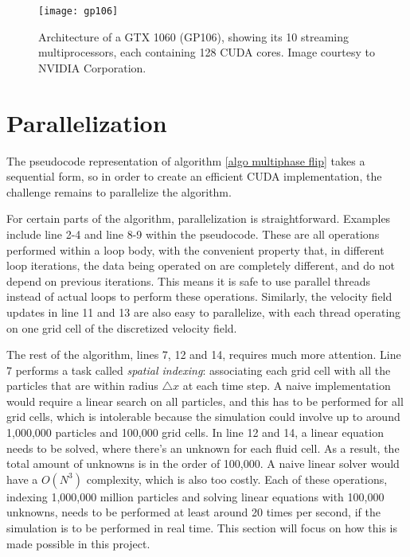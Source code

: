 \begin{figure}[H]
    \centering
    \texttt{[image: gp106]}
    \caption{Architecture of a GTX 1060 (GP106), showing its 10 streaming multiprocessors, each containing 128 CUDA cores. Image courtesy to NVIDIA Corporation.}
    \label{figure GTX1060}
\end{figure}



\section{Parallelization}
The pseudocode representation of algorithm \ref{algo multiphase flip} takes a sequential form, so in order to create an efficient CUDA implementation, the challenge remains to parallelize the algorithm.

For certain parts of the algorithm, parallelization is straightforward. Examples include line 2-4 and line 8-9 within the pseudocode. These are all operations performed within a loop body, with the convenient property that, in different loop iterations, the data being operated on are completely different, and do not depend on previous iterations. This means it is safe to use parallel threads instead of actual loops to perform these operations. Similarly, the velocity field updates in line 11 and 13 are also easy to parallelize, with each thread operating on one grid cell of the discretized velocity field. 

The rest of the algorithm, lines 7, 12 and 14, requires much more attention. Line 7 performs a task called \textit{spatial indexing}: associating each grid cell with all the particles that are within radius $\triangle x$ at each time step. A naive implementation would require a linear search on all particles, and this has to be performed for all grid cells, which is intolerable because the simulation could involve up to around 1,000,000 particles and 100,000 grid cells. In line 12 and 14, a linear equation needs to be solved, where there's an unknown for each fluid cell. As a result, the total amount of unknowns is in the order of 100,000. A naive linear solver would have a $O(N^3)$ complexity, which is also too costly. Each of these operations, indexing 1,000,000 million particles and solving linear equations with 100,000 unknowns, needs to be performed at least around 20 times per second, if the simulation is to be performed in real time. This section will focus on how this is made possible in this project.

